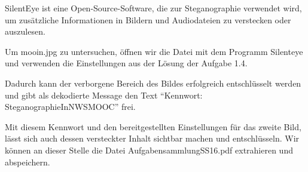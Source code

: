 \documentclass{article}
\begin{document}
SilentEye ist eine Open-Source-Software, die zur Steganographie verwendet wird, um 
zusätzliche Informationen in Bildern und Audiodateien zu verstecken oder auszulesen. 

Um mooin.jpg zu untersuchen, öffnen wir die Datei mit dem Programm Silenteye und 
verwenden die Einstellungen aus der Lösung der Aufgabe 1.4.

Dadurch kann der verborgene Bereich des Bildes erfolgreich entschlüsselt werden und 
gibt als dekodierte Message den Text ``Kennwort: SteganographieInNWSMOOC'' frei.

Mit diesem Kennwort und den bereitgestellten Einstellungen für das zweite Bild, lässt 
sich auch dessen versteckter Inhalt sichtbar machen und entschlüsseln. Wir können an 
dieser Stelle die Datei AufgabensammlungSS16.pdf extrahieren und abspeichern.
\end{document}
